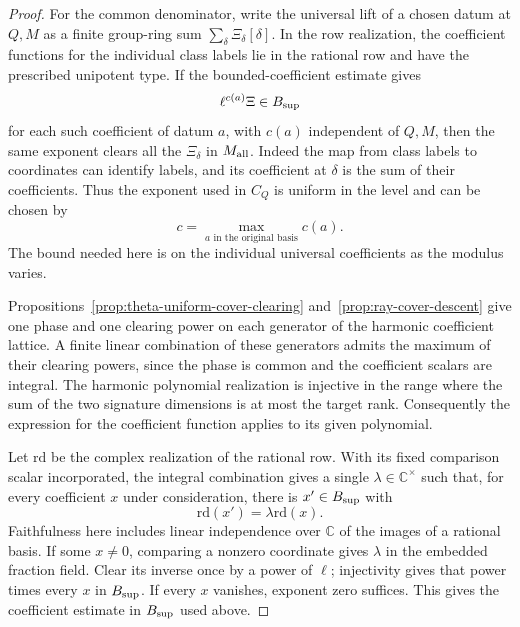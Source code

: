 \begin{proof}
For the common denominator, write the universal lift of a
chosen datum at \(Q,M\) as a finite group-ring sum
\(\sum_\delta \Xi_\delta[\delta]\). In the row realization,
the coefficient functions for the individual class labels
lie in the rational row and have the prescribed unipotent
type. If the bounded-coefficient estimate gives
\[
 \ell^{c(a)}\Xi\in B_{\rm sup}
\]
for each such coefficient
of datum \(a\), with \(c(a)\) independent of \(Q,M\),
then the same exponent clears all the \(\Xi_\delta\)
in \(M_{\rm all}\). Indeed the map from class labels to
coordinates can identify labels, and its coefficient at
\(\delta\) is the sum of their coefficients. Thus the exponent used in \(C_Q\) is uniform in the level and can be chosen by
\[
 c=\max_{a\text{ in the original basis}}c(a).
\]
The bound needed here is on the individual
universal coefficients as the modulus varies.

Propositions~\ref{prop:theta-uniform-cover-clearing}
and~\ref{prop:ray-cover-descent} give one phase and one
clearing power on each generator of the harmonic coefficient
lattice. A finite linear combination of these generators
admits the maximum of their clearing powers, since the phase
is common and the coefficient scalars are integral.
The harmonic polynomial realization is injective in the
range where the sum of the two signature dimensions is at
most the target rank. Consequently the expression for the
coefficient function applies to its given polynomial.

Let
\(\mathrm{rd}\) be the complex realization of the rational
row. With its fixed comparison scalar incorporated, the
integral combination gives a single \(\lambda\in\mathbb C^\times\)
such that, for every coefficient \(x\) under consideration,
there is \(x'\in B_{\rm sup}\) with
\[
 \mathrm{rd}(x')=\lambda\mathrm{rd}(x).
\]
Faithfulness
here includes linear independence over \(\mathbb C\) of
the images of a rational basis. If some \(x\ne0\), comparing
a nonzero coordinate gives \(\lambda\) in the embedded
fraction field. Clear its inverse once by a power of
\(\ell\); injectivity gives that power times every \(x\)
in \(B_{\rm sup}\). If every \(x\) vanishes, exponent zero
suffices. This gives the coefficient estimate in
\(B_{\rm sup}\) used above.

\end{proof}

